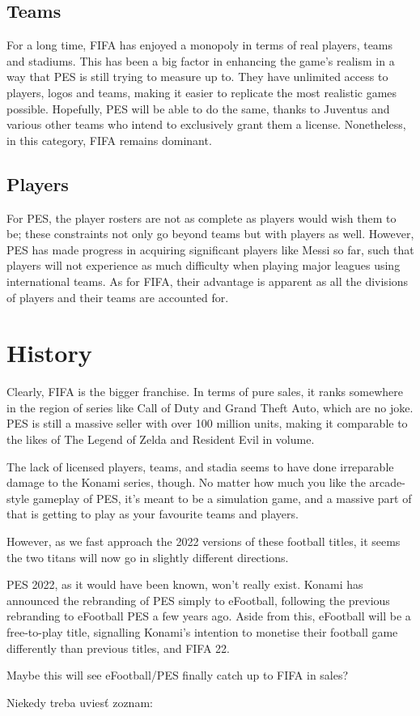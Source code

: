 \documentclass[12pt,twoside,english,a4paper]{article}
\begin{document}
\subsection{Teams} \label{aspects: teams}
For a long time, FIFA has enjoyed a monopoly in terms of real players, teams and stadiums. This has been a big factor in enhancing the game’s realism in a way that PES is still trying to measure up to. They have unlimited access to players, logos and teams, making it easier to replicate the most realistic games possible. Hopefully, PES will be able to do the same, thanks to Juventus and various other teams who intend to exclusively grant them a license. Nonetheless, in this category, FIFA remains dominant.

\subsection{Players} \label{aspects: players}
For PES, the player rosters are not as complete as players would wish them to be; these constraints not only go beyond teams but with players as well. However, PES has made progress in acquiring significant players like Messi so far, such that players will not experience as much difficulty when playing major leagues using international teams. As for FIFA, their advantage is apparent as all the divisions of players and their teams are accounted for. \cite{Stealthoptional.com}

\section{History} \label{history}
Clearly, FIFA is the bigger franchise. In terms of pure sales, it ranks somewhere in the region of series like Call of Duty and Grand Theft Auto, which are no joke. PES is still a massive seller with over 100 million units, making it comparable to the likes of The Legend of Zelda and Resident Evil in volume.

The lack of licensed players, teams, and stadia seems to have done irreparable damage to the Konami series, though. No matter how much you like the arcade-style gameplay of PES, it's meant to be a simulation game, and a massive part of that is getting to play as your favourite teams and players.

However, as we fast approach the 2022 versions of these football titles, it seems the two titans will now go in slightly different directions.

PES 2022, as it would have been known, won't really exist. Konami has announced the rebranding of PES simply to eFootball, following the previous rebranding to eFootball PES a few years ago. Aside from this, eFootball will be a free-to-play title, signalling Konami's intention to monetise their football game differently than previous titles, and FIFA 22.

Maybe this will see eFootball/PES finally catch up to FIFA in sales?

Niekedy treba uviesť zoznam:






\end{document}
